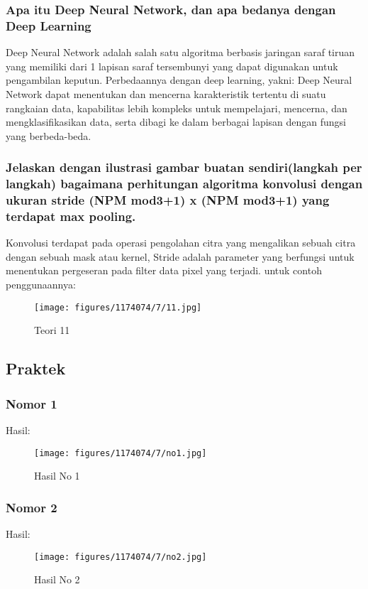 \subsubsection{Apa itu Deep Neural Network, dan apa bedanya dengan Deep Learning}
\hfill\break
Deep Neural Network adalah salah satu algoritma berbasis jaringan saraf tiruan yang memiliki dari 1 lapisan saraf tersembunyi yang dapat digunakan untuk pengambilan keputun. Perbedaannya dengan deep learning, yakni: Deep Neural Network dapat menentukan dan mencerna karakteristik tertentu di suatu rangkaian data, kapabilitas lebih kompleks untuk mempelajari, mencerna, dan mengklasifikasikan data, serta dibagi ke dalam berbagai lapisan dengan fungsi yang berbeda-beda.

\subsubsection{Jelaskan dengan ilustrasi gambar buatan sendiri(langkah per langkah) bagaimana perhitungan algoritma konvolusi dengan ukuran stride (NPM mod3+1) x (NPM mod3+1) yang terdapat max pooling.}	
\hfill\break
Konvolusi terdapat pada operasi pengolahan citra yang mengalikan sebuah citra dengan sebuah mask atau kernel, Stride adalah parameter yang berfungsi untuk menentukan pergeseran pada filter data pixel yang terjadi. untuk contoh penggunaannya:
\begin{figure}[H]
\centering
	\texttt{[image: figures/1174074/7/11.jpg]}
\caption{Teori 11}
\end{figure}



\subsection{Praktek}
\subsubsection{Nomor 1}
\hfill\break

Hasil:
\begin{figure}[H]
\centering
	\texttt{[image: figures/1174074/7/no1.jpg]}
	\caption{Hasil No 1}
\end{figure}

\subsubsection{Nomor 2}
\hfill\break

Hasil:
\begin{figure}[H]
\centering
	\texttt{[image: figures/1174074/7/no2.jpg]}
	\caption{Hasil No 2}
\end{figure}

